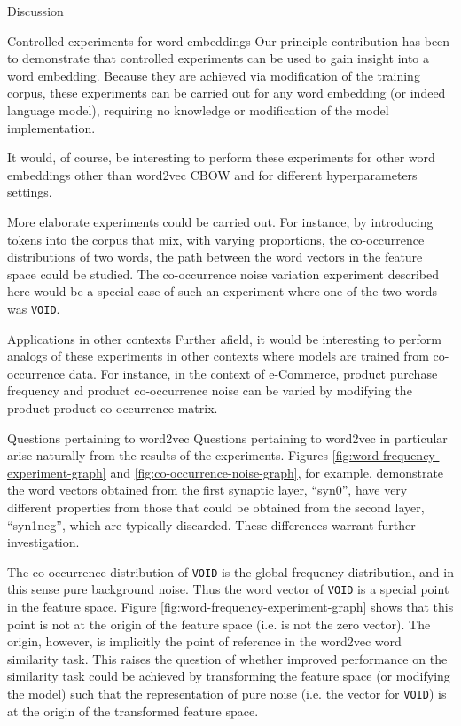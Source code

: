 \documentclass{article} %
\newcommand{\word}[1]{\texttt{#1}}
\begin{document}
\begin{section}{Discussion}\label{future-directions}

\begin{subsection}{Controlled experiments for word embeddings}
Our principle contribution has been to demonstrate that controlled experiments can be used to gain insight into a word embedding.
Because they are achieved via modification of the training corpus, these experiments can be carried out for any word embedding (or indeed language model), requiring no knowledge or modification of the model implementation.

It would, of course, be interesting to perform these experiments for other word embeddings other than word2vec CBOW and for different hyperparameters settings.

More elaborate experiments could be carried out.
For instance, by introducing tokens into the corpus that mix, with varying proportions, the co-occurrence distributions of two words, the path between the word vectors in the feature space could be studied.
The co-occurrence noise variation experiment described here would be a special case of such an experiment where one of the two words was \word{VOID}.
\end{subsection}

\begin{subsection}{Applications in other contexts}
Further afield, it would be interesting to perform analogs of these experiments in other contexts where models are trained from co-occurrence data.
For instance, in the context of e-Commerce, product purchase frequency and product co-occurrence noise can be varied by modifying the product-product co-occurrence matrix.
\end{subsection}

\begin{subsection}{Questions pertaining to word2vec}
Questions pertaining to word2vec in particular arise naturally from the results of the experiments.
Figures \ref{fig:word-frequency-experiment-graph} and \ref{fig:co-occurrence-noise-graph}, for example, demonstrate the word vectors obtained from the first synaptic layer, ``syn0'', have very different properties from those that could be obtained from the second layer, ``syn1neg'', which are typically discarded.
These differences warrant further investigation.

The co-occurrence distribution of \word{VOID} is the global frequency distribution, and in this sense pure background noise.
Thus the word vector of \word{VOID} is a special point in the feature space.
Figure \ref{fig:word-frequency-experiment-graph} shows that this point is not at the origin of the feature space (i.e. is not the zero vector).
The origin, however, is implicitly the point of reference in the word2vec word similarity task.
This raises the question of whether improved performance on the similarity task could be achieved by transforming the feature space (or modifying the model) such that the representation of pure noise (i.e. the vector for \word{VOID}) is at the origin of the transformed feature space. 


\end{subsection}
\end{section}
\end{document}
